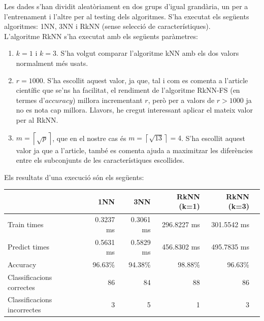 \documentclass{article} %
\begin{document}
{\color{blue}
	Les dades s'han dividit aleatòriament en dos grups d'igual grandària, un per a l'entrenament i l'altre per al testing dels algoritmes. S'ha executat els següents algoritmes: 1NN, 3NN i RkNN (sense selecció de característiques). \\

	L'algoritme RkNN s'ha executat amb els següents paràmetres:
	\begin{enumerate}
		\item $k = 1$ i $k = 3$. S'ha volgut comparar l'algoritme kNN amb els dos valors normalment més usats.
		\item $r = 1000$. S'ha escollit aquest valor, ja que, tal i com es comenta a l'article científic que se'ns ha facilitat, el rendiment de l'algoritme RkNN-FS (en termes d'$accuracy$) millora incrementant $r$, però per a valors de $r > 1000$ ja no es nota cap millora. Llavors, he cregut interessant aplicar el mateix valor per al RkNN.
		\item $m = \left \lceil{\sqrt{p}}\right \rceil$, que en el nostre cas és $m = \left \lceil{\sqrt{13}}\right \rceil = 4$. S'ha escollit aquest valor ja que a l'article, també es comenta ajuda a maximitzar les diferències entre els subconjunts de les característiques escollides.
	\end{enumerate}

	Els resultats d'una execució són els següents:

	\begin{changemargin}{-1.2cm}{0.5cm}
	{\selectfont\small
	\begin{tabular}{l | r r r r r}
		& 1NN & 3NN & RkNN (k=1) & RkNN (k=3) \\ \hline
		Train times 				& 0.3237 ms & 0.3061 ms & 296.8227 ms 	& 301.5542 ms\\
		Predict times 				& 0.5631 ms & 0.5829 ms & 456.8302 ms 	& 495.7835 ms\\
		Accuracy 					& 96.63\% 	& 94.38\%	& 98.88\% 		& 96.63\%	 \\
		Classificacions correctes 	& 86 		& 84		& 88			& 86		 \\
		Classificacions incorrectes & 3 		& 5 		& 1				& 3			 \\
	\end{tabular}
	}
	\end{changemargin}

}
\end{document}
